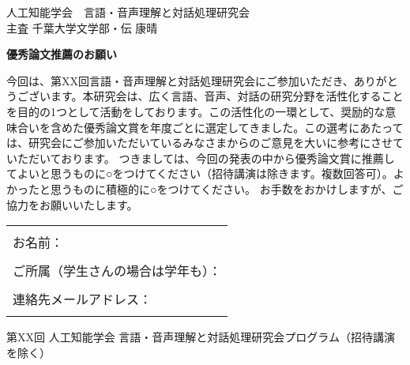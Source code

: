 \documentclass[a4paper,10pt]{jarticle}
\def\GM{千葉大学文学部・伝 康晴}
\def\ORDER{XX}
\def\NOTE{招待講演を除く}
\begin{document}
\pagestyle{empty}

\begin{flushright}
人工知能学会　言語・音声理解と対話処理研究会\\
主査 \GM
\end{flushright}


\begin{center}
\large \bf
優秀論文推薦のお願い	
\end{center}


今回は、第{\ORDER}回言語・音声理解と対話処理研究会にご参加いただき、ありがとうございます。本研究会は、広く言語、音声、対話の研究分野を活性化することを目的の1つとして活動をしております。この活性化の一環として、奨励的な意味合いを含めた優秀論文賞を年度ごとに選定してきました。この選考にあたっては、研究会にご参加いただいているみなさまからのご意見を大いに参考にさせていただいております。
つきましては、今回の発表の中から優秀論文賞に推薦してよいと思うものに○をつけてください（招待講演は除きます。複数回答可）。よかったと思うものに積極的に○をつけてください。
お手数をおかけしますが、ご協力をお願いいたします。

\begin{table}[h]
\begin{tabular}{p{17.5cm}}
\hline
\\
お名前： \\
\\
ご所属（学生さんの場合は学年も）：\\
\\
連絡先メールアドレス：\\
\\
\hline
\end{tabular}
\end{table}

\begin{center}
第{\ORDER}回 人工知能学会 言語・音声理解と対話処理研究会プログラム（\NOTE）	
\end{center}


\end{document}

